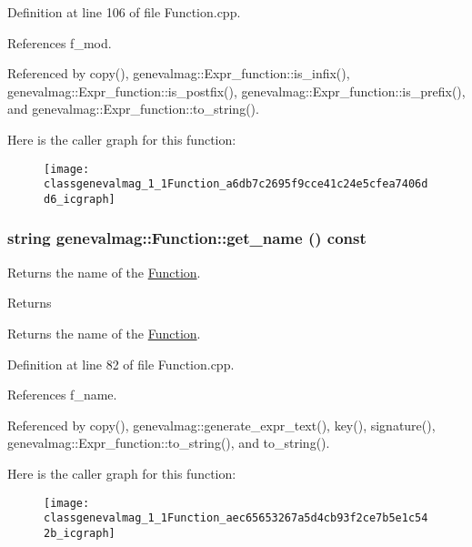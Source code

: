 Definition at line 106 of file Function.cpp.



References f\_\-mod.



Referenced by copy(), genevalmag::Expr\_\-function::is\_\-infix(), genevalmag::Expr\_\-function::is\_\-postfix(), genevalmag::Expr\_\-function::is\_\-prefix(), and genevalmag::Expr\_\-function::to\_\-string().



Here is the caller graph for this function:\nopagebreak
\begin{figure}[H]
\begin{center}
\leavevmode
\texttt{[image: classgenevalmag\_1\_1Function\_a6db7c2695f9cce41c24e5cfea7406dd6\_icgraph]}
\end{center}
\end{figure}


\hypertarget{classgenevalmag_1_1Function_aec65653267a5d4cb93f2ce7b5e1c542b}{
\subsubsection[{get\_\-name}]{\setlength{\rightskip}{0pt plus 5cm}string genevalmag::Function::get\_\-name () const}}
\label{classgenevalmag_1_1Function_aec65653267a5d4cb93f2ce7b5e1c542b}
Returns the name of the \hyperlink{classgenevalmag_1_1Function}{Function}. \begin{DoxyReturn}{Returns}

\end{DoxyReturn}
Returns the name of the \hyperlink{classgenevalmag_1_1Function}{Function}. 

Definition at line 82 of file Function.cpp.



References f\_\-name.



Referenced by copy(), genevalmag::generate\_\-expr\_\-text(), key(), signature(), genevalmag::Expr\_\-function::to\_\-string(), and to\_\-string().



Here is the caller graph for this function:\nopagebreak
\begin{figure}[H]
\begin{center}
\leavevmode
\texttt{[image: classgenevalmag\_1\_1Function\_aec65653267a5d4cb93f2ce7b5e1c542b\_icgraph]}
\end{center}
\end{figure}


